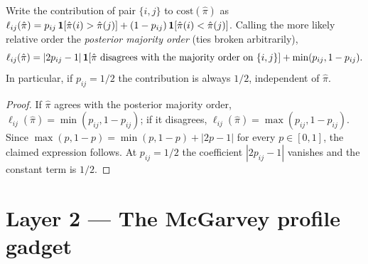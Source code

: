 \begin{lemma}
\label{lem:majority_form}
\leanok
{}
Write the contribution of pair $\{i,j\}$ to $\mathrm{cost}(\hat\pi)$ as
$\ell_{ij}(\hat\pi) = p_{ij}\,\mathbf{1}[\hat\pi(i)>\hat\pi(j)] +
(1-p_{ij})\,\mathbf{1}[\hat\pi(i)<\hat\pi(j)]$. Calling the more likely relative order
the \emph{posterior majority order} (ties broken arbitrarily),
\[
  \ell_{ij}(\hat\pi) =
  |2p_{ij}-1|\,\mathbf{1}[\hat\pi \text{ disagrees with the majority order on } \{i,j\}]
  + \min(p_{ij}, 1-p_{ij}).
\]
In particular, if $p_{ij} = 1/2$ the contribution is always $1/2$, independent of
$\hat\pi$.
\end{lemma}
\begin{proof}
\leanok
If $\hat\pi$ agrees with the posterior majority order, $\ell_{ij}(\hat\pi) =
\min(p_{ij}, 1-p_{ij})$; if it disagrees, $\ell_{ij}(\hat\pi) =
\max(p_{ij}, 1-p_{ij})$. Since $\max(p,1-p) = \min(p,1-p) + |2p-1|$ for every
$p \in [0,1]$, the claimed expression follows. At $p_{ij} = 1/2$ the coefficient
$|2p_{ij}-1|$ vanishes and the constant term is $1/2$.
\end{proof}

\section{Layer 2 --- The McGarvey profile gadget}

